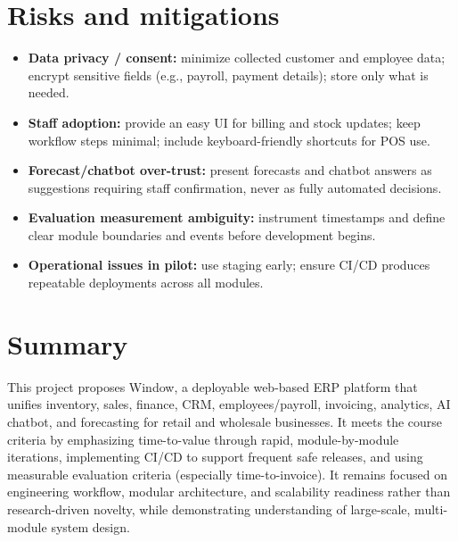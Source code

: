 \documentclass[11pt,a4paper]{article}
\begin{document}
\section{Risks and mitigations}
\begin{itemize}[leftmargin=0.7cm]
    \item \textbf{Data privacy / consent:} minimize collected customer and employee data; encrypt sensitive fields (e.g., payroll, payment details); store only what is needed.
    \item \textbf{Staff adoption:} provide an easy UI for billing and stock updates; keep workflow steps minimal; include keyboard-friendly shortcuts for POS use.
    \item \textbf{Forecast/chatbot over-trust:} present forecasts and chatbot answers as suggestions requiring staff confirmation, never as fully automated decisions.
    \item \textbf{Evaluation measurement ambiguity:} instrument timestamps and define clear module boundaries and events before development begins.
    \item \textbf{Operational issues in pilot:} use staging early; ensure CI/CD produces repeatable deployments across all modules.
\end{itemize}

\section{Summary}
This project proposes Window, a deployable web-based ERP platform that unifies inventory, sales, finance, CRM, employees/payroll, invoicing, analytics, AI chatbot, and forecasting for retail and wholesale businesses. It meets the course criteria by emphasizing time-to-value through rapid, module-by-module iterations, implementing CI/CD to support frequent safe releases, and using measurable evaluation criteria (especially time-to-invoice). It remains focused on engineering workflow, modular architecture, and scalability readiness rather than research-driven novelty, while demonstrating understanding of large-scale, multi-module system design.
\end{document}
